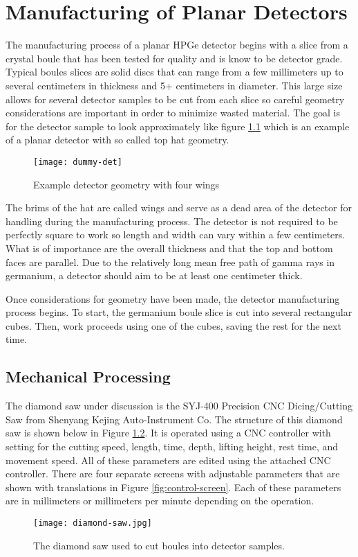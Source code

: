 \chapter{Manufacturing of Planar Detectors}
The manufacturing process of a planar HPGe detector begins with a slice from a crystal boule that has been tested for quality and is know to be detector grade.
Typical boules slices are solid discs that can range from a few millimeters up to several centimeters in thickness and 5+ centimeters in diameter.
This large size allows for several detector samples to be cut from each slice so careful geometry considerations are important in order to minimize wasted material.
The goal is for the detector sample to look approximately like figure \ref{fig:dummydet} which is an example of a planar detector with so called top hat geometry.
\begin{figure}[htpb]
\centering
\texttt{[image: dummy-det]}
\caption{Example detector geometry with four wings}
\label{fig:dummydet}
\end{figure}
The brims of the hat are called wings and serve as a dead area of the detector for handling during the manufacturing process.
The detector is not required to be perfectly square to work so length and width can vary within a few centimeters.
What is of importance are the overall thickness and that the top and bottom faces are parallel.
Due to the relatively long mean free path of gamma rays in germanium, a detector should aim to be at least one centimeter thick.

Once considerations for geometry have been made, the detector manufacturing process begins.
To start, the germanium boule slice is cut into several rectangular cubes.
Then, work proceeds using one of the cubes, saving the rest for the next time.%
\section{Mechanical Processing}
The diamond saw under discussion is the SYJ-400 Precision CNC Dicing/Cutting Saw from Shenyang Kejing Auto-Instrument Co.
The structure of this diamond saw is shown below in Figure \ref{fig:diamondsaw}.
It is operated using a CNC controller with setting for the cutting speed, length, time, depth, lifting height, rest time, and movement speed.
All of these parameters are edited using the attached CNC controller. 
There are four separate screens with adjustable parameters that are shown with translations in Figure \ref{fig:control-screen}. 
Each of these parameters are in millimeters or millimeters per minute depending on the operation.
\begin{figure}[htpb]
\centering
\texttt{[image: diamond-saw.jpg]}
\caption{The diamond saw used to cut boules into detector samples.}
\label{fig:diamondsaw}
\end{figure}

